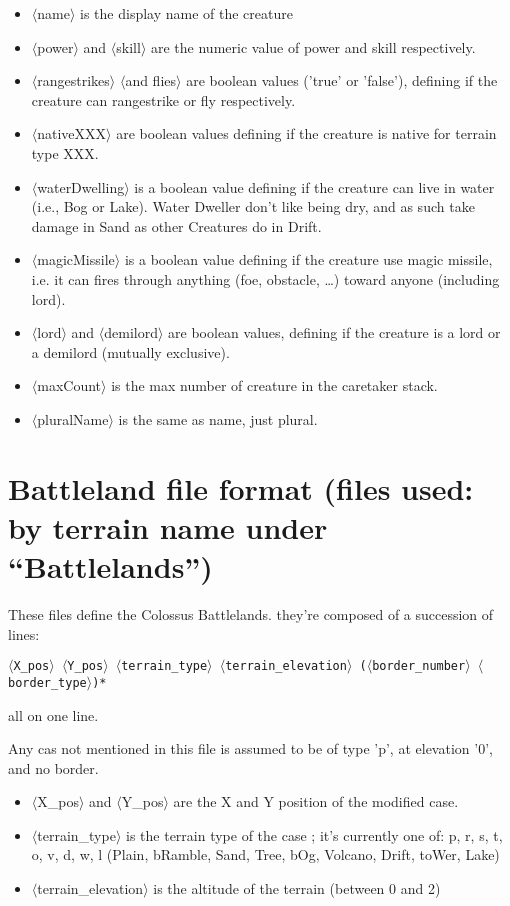 \documentclass{article}
\begin{document}
\begin{itemize}
\item $\langle$name$\rangle$ is the display name of the creature
\item $\langle$power$\rangle$ and $\langle$skill$\rangle$ are the numeric value of power and skill respectively.
\item $\langle$rangestrikes$\rangle$ $\langle$and flies$\rangle$ are boolean values ('true' or 'false'), defining if the creature can rangestrike or fly respectively.
\item $\langle$nativeXXX$\rangle$ are boolean values defining if the creature is native for terrain type XXX.
\item $\langle$waterDwelling$\rangle$ is a boolean value defining if the creature can live in water (i.e., Bog or Lake). Water Dweller don't like being dry, and as such take damage in Sand as other Creatures do in Drift.
\item $\langle$magicMissile$\rangle$ is a boolean value defining if the creature use magic missile, i.e. it can fires through anything (foe, obstacle, \ldots) toward anyone (including lord).
\item $\langle$lord$\rangle$ and $\langle$demilord$\rangle$ are boolean values, defining if the creature is a lord or a demilord (mutually exclusive).
\item $\langle$maxCount$\rangle$ is the max number of creature in the caretaker stack.
\item $\langle$pluralName$\rangle$ is the same as name, just plural.
\end{itemize}

\section{Battleland file format (files used: by terrain name under ``Battlelands'')}

These files define the Colossus Battlelands. they're composed
of a succession of lines:

\texttt{$\langle$X\_pos$\rangle$ $\langle$Y\_pos$\rangle$ $\langle$terrain\_type$\rangle$ $\langle$terrain\_elevation$\rangle$ ($\langle$border\_number$\rangle$ $\langle$border\_type$\rangle$)*}

all on one line.

Any cas not mentioned in this file is assumed to be of type 'p', at elevation '0', and no border.

\begin{itemize}
\item $\langle$X\_pos$\rangle$ and $\langle$Y\_pos$\rangle$ are the X and Y position of the modified case.
\item $\langle$terrain\_type$\rangle$ is the terrain type of the case ; it's currently one of: p, r, s, t, o, v, d, w, l (Plain, bRamble, Sand, Tree, bOg, Volcano, Drift, toWer, Lake)
\item $\langle$terrain\_elevation$\rangle$ is the altitude of the terrain (between 0 and 2)
\end{itemize}
\end{document}
